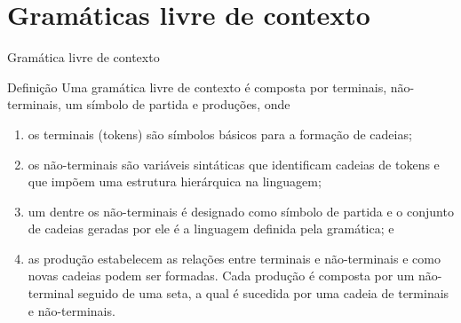 \section{Gramáticas livre de contexto}

\begin{frame}[fragile]{Gramática livre de contexto}

    \begin{block}{Definição}
        Uma gramática livre de contexto é composta por terminais, não-terminais, um símbolo de partida e produções, onde
        \begin{enumerate}
            \item os terminais (tokens) são símbolos básicos para a formação de cadeias;
            \item os não-terminais são variáveis sintáticas que identificam cadeias de tokens e que impõem uma estrutura hierárquica na linguagem;
            \item um dentre os não-terminais é designado como símbolo de partida e o conjunto de cadeias geradas por ele é a linguagem definida pela gramática; e
            \item as produção estabelecem as relações entre terminais e não-terminais e como novas cadeias podem ser formadas. Cada produção é composta por um
                não-terminal seguido de uma seta, a qual é sucedida por uma cadeia de terminais e não-terminais.
        \end{enumerate}
    \end{block}

\end{frame}

